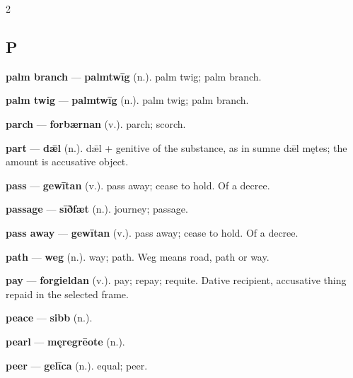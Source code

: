 \begin{multicols}{2}
\subsection*{P}
\textbf{palm branch} — \textbf{palmtwīg} (n.). palm twig; palm branch.\par
\textbf{palm twig} — \textbf{palmtwīg} (n.). palm twig; palm branch.\par
\textbf{parch} — \textbf{forbærnan} (v.). parch; scorch.\par
\textbf{part} — \textbf{dǣl} (n.). dǣl + genitive of the substance, as in sumne dǣl mętes; the amount is accusative object.\par
\textbf{pass} — \textbf{gewītan} (v.). pass away; cease to hold. Of a decree.\par
\textbf{passage} — \textbf{sīðfæt} (n.). journey; passage.\par
\textbf{pass away} — \textbf{gewītan} (v.). pass away; cease to hold. Of a decree.\par
\textbf{path} — \textbf{weg} (n.). way; path. Weg means road, path or way.\par
\textbf{pay} — \textbf{forgieldan} (v.). pay; repay; requite. Dative recipient, accusative thing repaid in the selected frame.\par
\textbf{peace} — \textbf{sibb} (n.).\par
\textbf{pearl} — \textbf{męregrēote} (n.).\par
\textbf{peer} — \textbf{gelīca} (n.). equal; peer.\par

\end{multicols}
